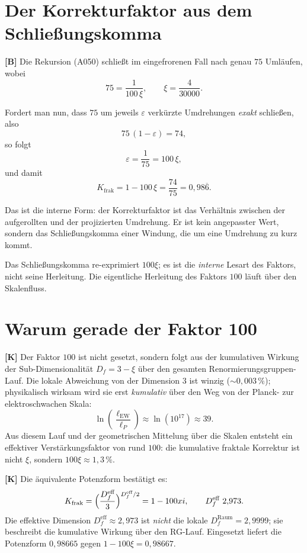 \section{Der Korrekturfaktor aus dem Schließungskomma}

\textbf{[B]} Die Rekursion (A050) schließt im eingefrorenen Fall nach genau
$75$ Umläufen, wobei
\[
  75 = \frac{1}{100\,\xi}, \qquad \xi = \frac{4}{30000}.
\]

Fordert man nun, dass $75$ um jeweils $\varepsilon$ verkürzte Umdrehungen
\emph{exakt} schließen, also
\[
  75\,(1-\varepsilon) = 74 ,
\]
so folgt
\[
  \varepsilon = \frac{1}{75} = 100\,\xi ,
\]
und damit
\[
  K_\text{frak} = 1 - 100\,\xi = \frac{74}{75} = 0{,}98\overline{6}.
\]

Das ist die interne Form: der Korrekturfaktor ist das Verhältnis zwischen der
aufgerollten und der projizierten Umdrehung. Er ist kein angepasster Wert,
sondern das Schließungskomma einer Windung, die um eine Umdrehung zu kurz
kommt.

Das Schließungskomma re-exprimiert $100\xi$; es ist die \emph{interne} Lesart des
Faktors, nicht seine Herleitung. Die eigentliche Herleitung des Faktors $100$
läuft über den Skalenfluss.

\section{Warum gerade der Faktor 100}

\textbf{[K]} Der Faktor $100$ ist nicht gesetzt, sondern folgt aus der
kumulativen Wirkung der Sub-Dimensionalität $D_f = 3-\xi$ über den gesamten
Renormierungsgruppen-Lauf. Die lokale Abweichung von der Dimension $3$ ist
winzig ($\sim 0{,}003\,\%$); physikalisch wirksam wird sie erst \emph{kumulativ}
über den Weg von der Planck- zur elektroschwachen Skala:
\[
  \ln\!\left(\frac{\ell_\text{EW}}{\ell_P}\right) \approx \ln(10^{17}) \approx 39 .
\]
Aus diesem Lauf und der geometrischen Mittelung über die Skalen entsteht ein
effektiver Verstärkungsfaktor von rund $100$: die kumulative fraktale Korrektur
ist nicht $\xi$, sondern $100\xi \approx 1{,}3\,\%$.

\textbf{[K]} Die äquivalente Potenzform bestätigt es:
\[
  K_\text{frak} = \Bigl(\frac{D_f^\text{eff}}{3}\Bigr)^{D_f^\text{eff}/2}
  = 1-100\xi, \qquad D_f^\text{eff} \approx 2{,}973 .
\]
Die effektive Dimension $D_f^\text{eff}\approx 2{,}973$ ist \emph{nicht} die
lokale $D_f^\text{Raum}=2{,}9999$; sie beschreibt die kumulative Wirkung über den
RG-Lauf. Eingesetzt liefert die Potenzform $0{,}98665$ gegen $1-100\xi =
0{,}98667$.

